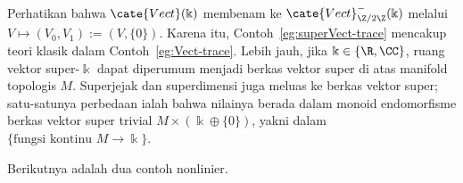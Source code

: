 Perhatikan bahwa $\cate{Vect}(\Bbbk)$ membenam ke
$\cate{Vect}^-_{\Z/2\Z}(\Bbbk)$ melalui
$V\mapsto(V_0,V_1):=(V,\{0\})$. Karena itu,
Contoh~\ref{eg:superVect-trace} mencakup teori klasik dalam
Contoh~\ref{eg:Vect-trace}. Lebih jauh, jika $\Bbbk\in\{\R,\CC\}$,
ruang vektor super-$\Bbbk$ dapat diperumum menjadi berkas vektor super di
atas manifold topologis $M$. Superjejak dan superdimensi juga meluas ke
berkas vektor super; satu-satunya perbedaan ialah bahwa nilainya berada
dalam monoid endomorfisme berkas vektor super trivial
$M\times(\Bbbk\oplus\{0\})$, yakni dalam
$\{\text{fungsi kontinu }M\to\Bbbk\}$.

Berikutnya adalah dua contoh nonlinier.

